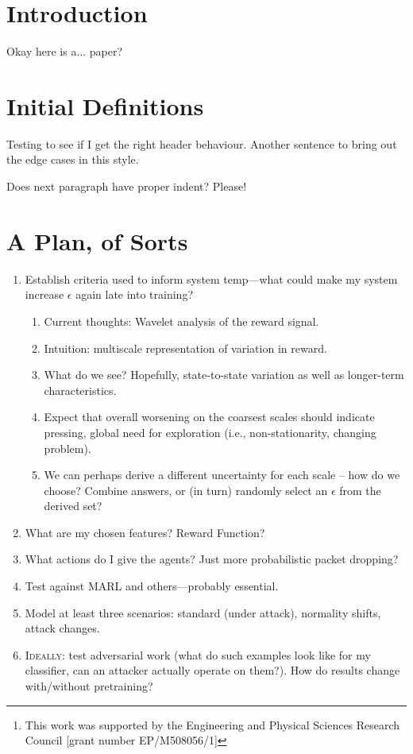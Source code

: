 \documentclass[conference,10pt]{IEEEtran}
\title{\mytitle{}}
\author{Kyle A. Simpson\thanks{This work was supported by the Engineering and Physical Sciences
		Research Council [grant number EP/M508056/1]},\\\emph{University of Glasgow, Glasgow, Scotland},\\
		\email{k.simpson.1@research.gla.ac.uk}}
\date{}
\begin{document}

\maketitle

\begin{abstract}
	Make it look convincing!
\end{abstract}

\section{Introduction}

Okay here is a... paper?

\section{Initial Definitions}

Testing to see if I get the right header behaviour.
Another sentence to bring out the edge cases in this style.

Does next paragraph have proper indent? Please!

\section{A Plan, of Sorts}

\begin{enumerate}
	\item Establish criteria used to inform system temp---what could make my system increase $\epsilon$ again late into training?
	\begin{enumerate}
		\item Current thoughts: Wavelet analysis of the reward signal.
		\item Intuition: multiscale representation of variation in reward.
		\item What do we see? Hopefully, state-to-state variation as well as longer-term characteristics.
		\item Expect that overall worsening on the coarsest scales should indicate pressing, global need for exploration  (i.e., non-stationarity, changing problem).
		\item We can perhaps derive a different uncertainty for each scale -- how do we choose? Combine answers, or (in turn) randomly select an $\epsilon$ from the derived set?
	\end{enumerate}
	\item What are my chosen features? Reward Function?
	\item What actions do I give the agents? Just more probabilistic packet dropping?
	\item Test against MARL and others---probably essential.
	\item Model at least three scenarios: standard (under attack), normality shifts, attack changes.
	\item \textsc{Ideally:} test adversarial work (what do such examples look like for my classifier, can an attacker actually operate on them?). How do results change with/without pretraining?
\end{enumerate}

\printbibliography
\end{document}
